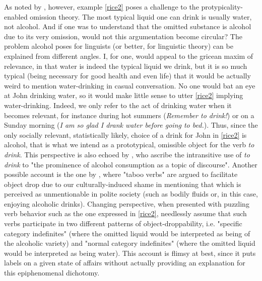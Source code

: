 As noted by \textcite[125]{Naess2007}, however, example \ref{rice2} poses a challenge to the protypicality-enabled omission theory. The most typical liquid one can drink is usually water, not alcohol. And if one was to understand that the omitted substance is alcohol due to its very omission, would not this argumentation become circular? The problem alcohol poses for linguists (or better, for linguistic theory) can be explained from different angles. I, for one, would appeal to the gricean maxim of relevance, in that water is indeed the typical liquid we drink, but it is so much typical (being necessary for good health and even life) that it would be actually weird to mention water-drinking in casual conversation. No one would bat an eye at John drinking water, so it would make little sense to utter \ref{rice2} implying water-drinking. Indeed, we only refer to the act of drinking water when it becomes relevant, for instance during hot summers (\textit{Remember to drink!}) or on a Sunday morning (\textit{I am so glad I drank water before going to bed.}). Thus, since the only socially relevant, statistically likely, choice of a drink for John in \ref{rice2} is alcohol, that is what we intend as a prototypical, omissible object for the verb \textit{to drink}. This perspective is also echoed by \textcite[14]{NewmanRice2006}, who ascribe the intransitive use of \textit{to drink} to "the prominence of alcohol consumption as a topic of discourse". Another possible account is the one by \textcite[21-28]{Goldberg2005}, where "taboo verbs" are argued to facilitate object drop due to our culturally-induced shame in mentioning that which is perceived as unmentionable in polite society (such as bodily fluids or, in this case, enjoying alcoholic drinks).  Changing perspective, when presented with puzzling verb behavior such as the one expressed in \ref{rice2}, \textcite[303-305]{HuddlestonEtAl2002} needlessly assume that such verbs participate in two different patterns of object-droppability, i.e. "specific category indefinites" (where the omitted liquid would be interpreted as being of the alcoholic variety) and "normal category indefinites" (where the omitted liquid would be interpreted as being water). This account is flimsy at best, since it puts labels on a given state of affairs without actually providing an explanation for this epiphenomenal dichotomy.\\
